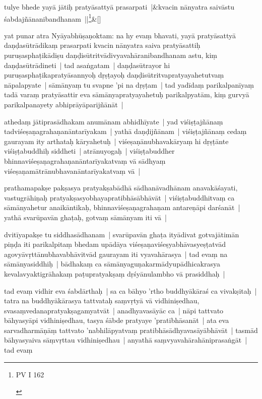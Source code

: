 \documentclass[article,a4paper]{memoir}
\begin{document}
	    
	    \stanza[\smallbreak]
tulye bhede yayā\- jā\-tiḥ pratyā\-sattyā\- prasarpati |&kvacin nā\-nyatra saivā\-stu śabdajñā\-nanibandhanam ||\footnote{\begin{english}PV I 162\end{english}}\&[\smallbreak]


	

	  \pstart yat punar atra Nyā\-yabhū\-ṣaṇoktam: na hy evaṃ bhavati, yayā\- pratyā\-sattyā\- daṇḍasū\-trā\-dikaṃ prasarpati kvacin nā\-nyatra saiva pratyā\-sattiḥ puruṣasphaṭikā\-diṣu daṇḍisū\-tritvā\-divyavahā\-ranibandhanam astu, kiṃ daṇḍasū\-trā\-dineti | tad asaṅgatam | daṇḍasū\-trayor hi puruṣasphaṭikapratyā\-sannyoḥ dṛṣṭayoḥ daṇḍisū\-tritvapratyayahetutvaṃ nā\-palapyate | sā\-mā\-nyaṃ tu svapne 'pi na dṛṣṭam | tad yadī\-daṃ parikalpanī\-yaṃ tadā\- varaṃ pratyā\-sattir eva sā\-mā\-nyapratyayahetuḥ parikalpyatā\-m, kiṃ gurvyā\- parikalpanayety abhiprā\-yā\-parijñā\-nā\-t |
	\pend
      

	  \pstart {}\label{thakur75-65.1} athedaṃ jā\-tiprasā\-dhakam anumā\-nam abhidhī\-yate | yad viśiṣṭajñā\-naṃ tadviśeṣaṇagrahaṇanā\-ntarī\-yakam | yathā\- daṇḍijñā\-nam | viśiṣṭajñā\-naṃ cedaṃ gaurayam ity arthataḥ kā\-ryahetuḥ | viśeṣaṇā\-nubhavakā\-ryaṃ hi dṛṣṭā\-nte viśiṣṭabuddhiḥ siddheti | atrā\-nuyogaḥ | viśiṣṭabuddher bhinnaviśeṣaṇagrahaṇanā\-ntarī\-yakatvaṃ vā\- sā\-dhyaṃ viśeṣaṇamā\-trā\-nubhavanā\-ntarī\-yakatvaṃ vā\- |
	\pend
      

	  \pstart {}\label{thakur75-65.6} prathamapakṣe pakṣasya pratyakṣabā\-dhā\- sā\-dhanā\-vadhā\-nam anavakā\-śayati, vastugrā\-hiṇaḥ pratyakṣasyobhayapratibhā\-sā\-bhā\-vā\-t | viśiṣṭabuddhitvaṃ ca sā\-mā\-nyahetur anaikā\-ntikaḥ, bhinnaviśeṣaṇagrahaṇam antareṇā\-pi darśanā\-t | yathā\- svarū\-pavā\-n ghaṭaḥ, gotvaṃ sā\-mā\-nyam iti vā\- |
	\pend
      

	  \pstart {}\label{thakur75-65.10} dvitī\-yapakṣe tu siddhasā\-dhanam | svarū\-pavā\-n ghaṭa ityā\-divat gotvajā\-timā\-n piṇḍa iti parikalpitaṃ bhedam upā\-dā\-ya viśeṣaṇaviśeṣyabhā\-vasyeṣṭatvā\-d agovyā\-vṛttā\-nubhavabhā\-vitvā\-d gaurayam iti vyavahā\-rasya | tad evaṃ na sā\-mā\-nyasiddhiḥ | bā\-dhakaṃ ca sā\-mā\-nyaguṇakarmā\-dyupā\-dhicakrasya kevalavyaktigrā\-hakaṃ paṭupratyakṣaṃ dṛśyā\-nulambho vā\- prasiddhaḥ |
	\pend
      

	  \pstart {}\label{thakur75-65.15} tad evaṃ vidhir eva śabdā\-rthaḥ | sa ca bā\-hyo 'rtho buddhyā\-kā\-raś ca vivakṣitaḥ | tatra na buddhyā\-kā\-rasya tattvataḥ saṃvṛtyā\- vā\- vidhiniṣedhau, svasaṃvedanapratyakṣagamyatvā\-t | anadhyavasā\-yā\-c ca | nā\-pi tattvato bā\-hyasyā\-pi vidhiniṣedhau, tasya śā\-bde pratyaye 'pratibhā\-sanā\-t | ata eva sarvadharmā\-ṇā\-ṃ tattvato 'nabhilā\-pyatvaṃ pratibhā\-sā\-dhyavasā\-yā\-bhā\-vā\-t | tasmā\-d bā\-hyasyaiva sā\-ṃvṛttau vidhiniṣedhau | anyathā\- saṃvyavahā\-rahā\-niprasaṅgā\-t | tad evaṃ
	\pend
      
\end{document}
